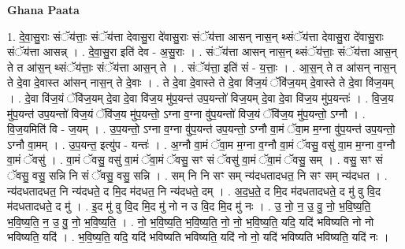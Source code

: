 \documentclass[17pt]{extarticle}
\begin{document}
\textbf{Ghana Paata } \newline

1. दे॒वा॒सु॒राः संॅय॑त्ताः॒ संॅय॑त्ता देवासु॒रा दे॑वासु॒राः संॅय॑त्ता आसन् नास॒न् थ्संॅय॑त्ता देवासु॒रा दे॑वासु॒राः संॅय॑त्ता आसन्न् । . दे॒वा॒सु॒रा इति॑ देव - अ॒सु॒राः । . संॅय॑त्ता आसन् नास॒न् थ्संॅय॑त्ताः॒ संॅय॑त्ता आस॒न् ते त आ॑स॒न् थ्संॅय॑त्ताः॒ संॅय॑त्ता आस॒न् ते । . संॅय॑त्ता॒ इति॑ सं - य॒त्ताः॒ । . आ॒स॒न् ते त आ॑सन् नास॒न् ते दे॒वा दे॒वास्त आ॑सन् नास॒न् ते दे॒वाः । . ते दे॒वा दे॒वास्ते ते दे॒वा वि॑ज॒यं ॅवि॑ज॒यम् दे॒वास्ते ते दे॒वा वि॑ज॒यम् । . दे॒वा वि॑ज॒यं ॅवि॑ज॒यम् दे॒वा दे॒वा वि॑ज॒य मु॑प॒यन्त॑ उप॒यन्तो॑ विज॒यम् दे॒वा दे॒वा वि॑ज॒य मु॑प॒यन्तः॑ । . वि॒ज॒य मु॑प॒यन्त॑ उप॒यन्तो॑ विज॒यं ॅवि॑ज॒य मु॑प॒यन्तो॒ ऽग्ना व॒ग्ना वु॑प॒यन्तो॑ विज॒यं ॅवि॑ज॒य मु॑प॒यन्तो॒ ऽग्नौ । . वि॒ज॒यमिति॑ वि - ज॒यम् । . उ॒प॒यन्तो॒ ऽग्ना व॒ग्ना वु॑प॒यन्त॑ उप॒यन्तो॒ ऽग्नौ वा॒मं ॅवा॒म म॒ग्ना वु॑प॒यन्त॑ उप॒यन्तो॒ ऽग्नौ वा॒मम् । . उ॒प॒यन्त॒ इत्यु॑प - यन्तः॑ । . अ॒ग्नौ वा॒मं ॅवा॒म म॒ग्ना व॒ग्नौ वा॒मं ॅवसु॒ वसु॑ वा॒म म॒ग्ना व॒ग्नौ वा॒मं ॅवसु॑ । . वा॒मं ॅवसु॒ वसु॑ वा॒मं ॅवा॒मं ॅवसु॒ सꣳ सं ॅवसु॑ वा॒मं ॅवा॒मं ॅवसु॒ सम् । . वसु॒ सꣳ सं ॅवसु॒ वसु॒ सन्नि नि सं ॅवसु॒ वसु॒ सन्नि । . सम् नि नि सꣳ सम् न्य॑दधतादधत॒ नि सꣳ सम् न्य॑दधत । . न्य॑दधतादधत॒ नि न्य॑दधते॒ द मि॒द म॑दधत॒ नि न्य॑दधते॒ दम् । . अ॒द॒ध॒ते॒ द मि॒द म॑दधतादधते॒ द मु॑ वु वि॒द म॑दधतादधते॒ द मु॑ । . इ॒द मु॑ वु वि॒द मि॒द मु॑ नो न उ वि॒द मि॒द मु॑ नः । . उ॒ नो॒ न॒ उ॒ वु॒ नो॒ भ॒वि॒ष्य॒ति॒ भ॒वि॒ष्य॒ति॒ न॒ उ॒ वु॒ नो॒ भ॒वि॒ष्य॒ति॒ । . नो॒ भ॒वि॒ष्य॒ति॒ भ॒वि॒ष्य॒ति॒ नो॒ नो॒ भ॒वि॒ष्य॒ति॒ यदि॒ यदि॑ भविष्यति नो नो भविष्यति॒ यदि॑ । . भ॒वि॒ष्य॒ति॒ यदि॒ यदि॑ भविष्यति भविष्यति॒ यदि॑ नो नो॒ यदि॑ भविष्यति भविष्यति॒ यदि॑ नः । \newline
\end{document}
